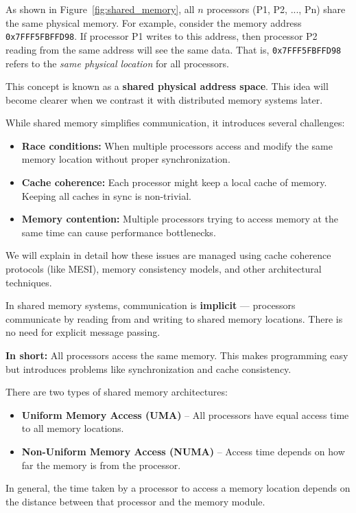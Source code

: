 \documentclass[12pt]{book}
\begin{document}
As shown in Figure~\ref{fig:shared_memory}, all $n$ processors (P1, P2, ..., Pn) share the same physical memory. For example, consider the memory address \texttt{0x7FFF5FBFFD98}. If processor P1 writes to this address, then processor P2 reading from the same address will see the same data. That is, \texttt{0x7FFF5FBFFD98} refers to the \textit{same physical location} for all processors.

This concept is known as a \textbf{shared physical address space}. This idea will become clearer when we contrast it with distributed memory systems later.

While shared memory simplifies communication, it introduces several challenges:
\begin{itemize}
    \item \textbf{Race conditions:} When multiple processors access and modify the same memory location without proper synchronization.
    \item \textbf{Cache coherence:} Each processor might keep a local cache of memory. Keeping all caches in sync is non-trivial.
    \item \textbf{Memory contention:} Multiple processors trying to access memory at the same time can cause performance bottlenecks.
\end{itemize}

We will explain in detail how these issues are managed using cache coherence protocols (like MESI), memory consistency models, and other architectural techniques.

In shared memory systems, communication is \textbf{implicit} — processors communicate by reading from and writing to shared memory locations. There is no need for explicit message passing.

\textbf{In short:} All processors access the same memory. This makes programming easy but introduces problems like synchronization and cache consistency.

There are two types of shared memory architectures:
\begin{itemize}
    \item \textbf{Uniform Memory Access (UMA)} – All processors have equal access time to all memory locations.
    \item \textbf{Non-Uniform Memory Access (NUMA)} – Access time depends on how far the memory is from the processor.
\end{itemize}

In general, the time taken by a processor to access a memory location depends on the distance between that processor and the memory module.
\end{document}

